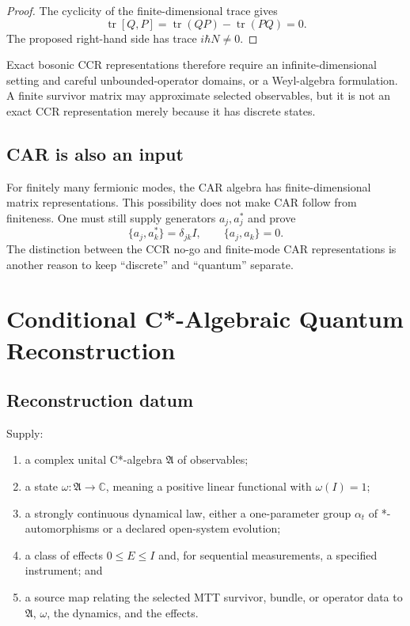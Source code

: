 \documentclass[11pt]{article}
\newcommand{\Alg}{\mathfrak A}
\begin{document}
\begin{proof}
The cyclicity of the finite-dimensional trace gives
\[
 \operatorname{tr}[Q,P]
 =\operatorname{tr}(QP)-\operatorname{tr}(PQ)=0.
\]
The proposed right-hand side has trace $i\hbar N\ne0$.
\end{proof}

Exact bosonic CCR representations therefore require an infinite-dimensional
setting and careful unbounded-operator domains, or a Weyl-algebra formulation.
A finite survivor matrix may approximate selected observables, but it is not
an exact CCR representation merely because it has discrete states.

\subsection{CAR is also an input}

For finitely many fermionic modes, the CAR algebra has finite-dimensional
matrix representations.  This possibility does not make CAR follow from
finiteness.  One must still supply generators $a_j,a_j^*$ and prove
\[
 \{a_j,a_k^*\}=\delta_{jk}I,
 \qquad
 \{a_j,a_k\}=0.
\]
The distinction between the CCR no-go and finite-mode CAR representations is
another reason to keep ``discrete'' and ``quantum'' separate.

\section{Conditional C*-Algebraic Quantum Reconstruction}

\subsection{Reconstruction datum}

\begin{assumption}\label{ass:quantum}
Supply:
\begin{enumerate}
\item a complex unital C*-algebra $\Alg$ of observables;
\item a state $\omega:\Alg\to\mathbb C$, meaning a positive linear functional
with $\omega(I)=1$;
\item a strongly continuous dynamical law, either a one-parameter group
$\alpha_t$ of *-automorphisms or a declared open-system evolution;
\item a class of effects $0\le E\le I$ and, for sequential measurements, a
specified instrument; and
\item a source map relating the selected MTT survivor, bundle, or operator data
to $\Alg$, $\omega$, the dynamics, and the effects.
\end{enumerate}
\end{assumption}
\end{document}
